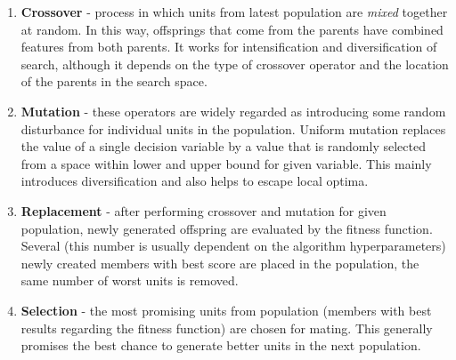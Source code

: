 \documentclass[12pt,a4paper,openany]{book}
\begin{document}





\begin{enumerate}
\item \textbf{Crossover} - process in which units from latest population are \textit{mixed} together at random. In this way, offsprings that come from the parents have combined features from both parents. It works for intensification and diversification of search, although it depends on the type of crossover operator and the location of the parents in the search space.
\item \textbf{Mutation} - these operators are widely regarded as introducing some random disturbance for individual units in the population. Uniform mutation replaces the value of a single decision variable by a value that is randomly selected from a space within lower and upper bound for given variable. This mainly introduces diversification and also helps to escape local optima.
\item \textbf{Replacement} - after performing crossover and mutation for given population, newly generated offspring are evaluated by the fitness function. Several (this number is usually dependent on the algorithm hyperparameters) newly created members with best score are placed in the population, the same number of worst units is removed.
\item \textbf{Selection} - the most promising units from population (members with best results regarding the fitness function) are chosen for mating. This generally promises the best chance to generate better units in the next population.
\end{enumerate}
\end{document}
